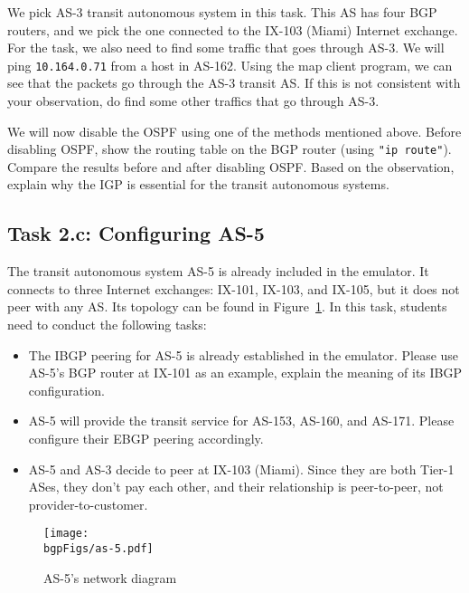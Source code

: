 We pick AS-3 transit autonomous system in this 
task. This AS has four BGP routers, and we pick the one 
connected to the IX-103 (Miami) Internet exchange.
For the task, we also need to find some traffic that 
goes through AS-3. 
We will ping \texttt{10.164.0.71} from a host in AS-162. Using the 
map client program, we can see that the packets go through
the AS-3 transit AS. If this is not consistent with your observation,
do find some other traffics that go through AS-3. 


We will now disable the OSPF using one of the methods mentioned above.
Before disabling OSPF, show the routing table 
on the BGP router (using \texttt{"ip route"}). Compare the 
results before and after disabling OSPF. Based on the 
observation, explain why the IGP is essential for the transit 
autonomous systems. 



\subsection{Task 2.c: Configuring AS-5} 

The transit autonomous system AS-5 is already included in the emulator. 
It connects to three 
Internet exchanges: IX-101, IX-103, and IX-105,
but it does not peer with any AS. Its topology can be found 
in Figure~\ref{bgp:fig:as5}.
In this task, students need to conduct the following tasks:

\begin{itemize}
  \item The IBGP peering for AS-5 is already established in the 
    emulator. Please use AS-5's BGP router at IX-101 as an example,
    explain the meaning of its IBGP configuration.

  \item AS-5 will provide the transit service for AS-153, AS-160, and AS-171. 
    Please configure their EBGP peering accordingly.

  \item AS-5 and AS-3 decide to peer at IX-103 (Miami). 
    Since they are both Tier-1 ASes, they don't pay each other, 
    and their relationship is peer-to-peer, not provider-to-customer.
\end{itemize}


\begin{figure}[htb]
  \begin{center}
    \texttt{[image: \\bgpFigs/as-5.pdf]}
  \end{center}
  \caption{AS-5's network diagram}
  \label{bgp:fig:as5}
\end{figure}


